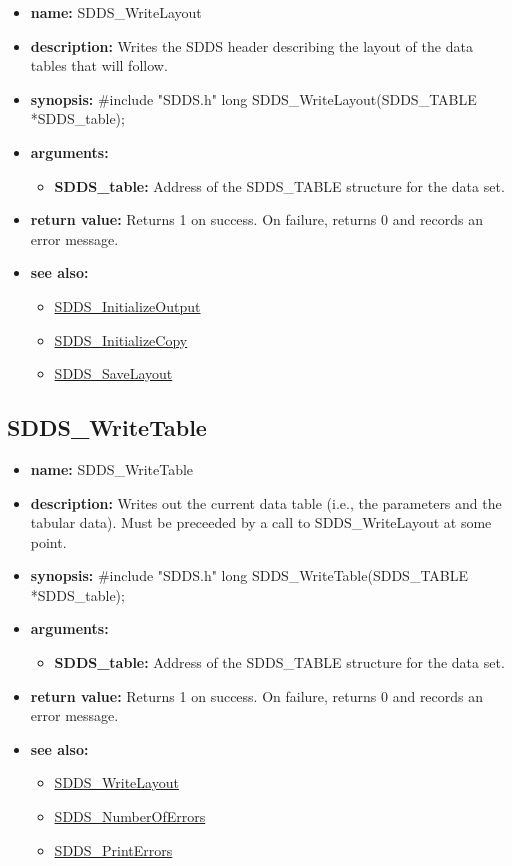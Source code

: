 \documentclass[11pt]{article}
\newcommand{\progref}[1]{\hyperref{SDDS_#1}{{\tt SDDS\_#1} (}{)}{SDDS_#1}}
\begin{document}
\begin{itemize}
\item {\bf name:}\newline
SDDS\_WriteLayout
\item {\bf description:}\newline
Writes the SDDS header describing the layout of the data tables that will follow.
\item {\bf synopsis:} \#include "SDDS.h"\newline
long SDDS\_WriteLayout(SDDS\_TABLE *SDDS\_table);
\item {\bf arguments:}
\begin{itemize}
\item {\bf SDDS\_table:} Address of the SDDS\_TABLE structure for the data set.
\end{itemize}
\item {\bf return value:}\newline
Returns 1 on success. On failure, returns 0 and records an error message.
\item {\bf see also:}
\begin{itemize}
\item \progref{InitializeOutput}
\item \progref{InitializeCopy}
\item \progref{SaveLayout}
\end{itemize}
\end{itemize}

\subsection{SDDS\_WriteTable}
\label{SDDS_WriteTable}

\begin{itemize}
\item {\bf name:}\newline
SDDS\_WriteTable
\item {\bf description:}\newline
Writes out the current data table (i.e., the parameters and the tabular data). Must be preceeded by a call to SDDS\_WriteLayout at some point.
\item {\bf synopsis:} \#include "SDDS.h"\newline
long SDDS\_WriteTable(SDDS\_TABLE *SDDS\_table);
\item {\bf arguments:}
\begin{itemize}
\item {\bf SDDS\_table:} Address of the SDDS\_TABLE structure for the data set.
\end{itemize}
\item {\bf return value:}\newline
Returns 1 on success. On failure, returns 0 and records an error message.
\item {\bf see also:}
\begin{itemize}
\item \progref{WriteLayout}
\item \progref{NumberOfErrors}
\item \progref{PrintErrors}
\end{itemize}
\end{itemize}

\tableofcontents
\end{document}
